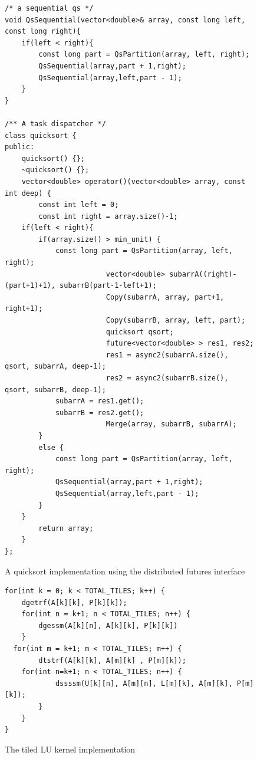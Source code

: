 \begin{figure}[!ht]
\begin{lstlisting}
/* a sequential qs */
void QsSequential(vector<double>& array, const long left, const long right){
    if(left < right){
        const long part = QsPartition(array, left, right);
        QsSequential(array,part + 1,right);
        QsSequential(array,left,part - 1);
    }
}
 
/** A task dispatcher */
class quicksort {
public:
	quicksort() {};
	~quicksort() {};
	vector<double> operator()(vector<double> array, const int deep) {
		const int left = 0;
		const int right = array.size()-1;
    if(left < right){
        if(array.size() > min_unit) {
            const long part = QsPartition(array, left, right);
 						vector<double> subarrA((right)-(part+1)+1), subarrB(part-1-left+1);
						Copy(subarrA, array, part+1, right+1);
						Copy(subarrB, array, left, part);
						quicksort qsort;
						future<vector<double> > res1, res2;
						res1 = async2(subarrA.size(), qsort, subarrA, deep-1);
						res2 = async2(subarrB.size(), qsort, subarrB, deep-1);
            subarrA = res1.get();
            subarrB = res2.get();
						Merge(array, subarrB, subarrA);
        }
        else {
            const long part = QsPartition(array, left, right);
            QsSequential(array,part + 1,right);
            QsSequential(array,left,part - 1);
        }
    }
		return array;
	}
};

\end{lstlisting}
\caption{A quicksort implementation using the distributed futures interface}
\label{lst:quicksort}
\end{figure}


\begin{figure}[!ht]
\begin{lstlisting}
for(int k = 0; k < TOTAL_TILES; k++) {
	dgetrf(A[k][k], P[k][k]);
	for(int n = k+1; n < TOTAL_TILES; n++) {
		dgessm(A[k][n], A[k][k], P[k][k])
	}
  for(int m = k+1; m < TOTAL_TILES; m++) {
		dtstrf(A[k][k], A[m][k] , P[m][k]);
  	for(int n=k+1; n < TOTAL_TILES; n++) {
			dssssm(U[k][n], A[m][n], L[m][k], A[m][k], P[m][k]);
		}
	}
}

\end{lstlisting}
\caption{The tiled LU kernel implementation}
\label{lst:tiledLUseq}
\end{figure}


